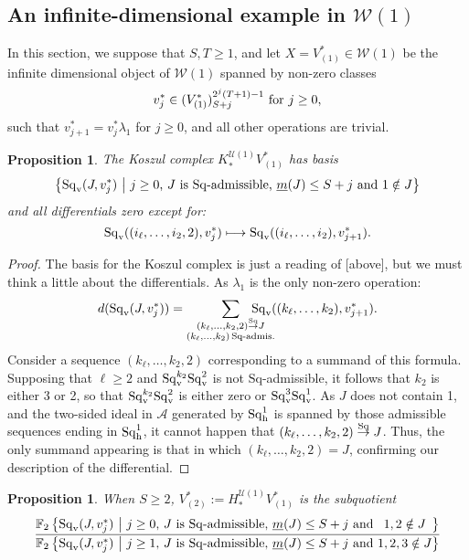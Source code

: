 \documentclass[11pt]{amsart}
\theoremstyle{plain}
\newtheorem{prop}[thm]{Proposition}
\theoremstyle{definition}
\newcommand{\calU}{\mathcal{U}}
\newcommand{\calA}{\mathcal{A}}
\newcommand{\calw}{\mathcal{W}}
\theoremstyle{plain}
\newcommand{\minDimSq}{\underline{m}}
\newcommand{\produces}[3]{#3:#1\sim #2}
\renewcommand{\produces}[3]{#1\rightarrow_{#3} #2}%
\renewcommand{\produces}[3]{#1\overset{\smash{#3}}{\rightarrow} #2}%
\newcommand{\Sq}{\mathrm{Sq}}
\newcommand{\Sqh}{\mathrm{Sq}_\textup{h}}
\newcommand{\Sqv}{\mathrm{Sq}_\textup{v}}
\newcommand{\LieSteen}{\calA}
\newcommand{\F}{\mathbb{F}}
\begin{document}
\begin{Calculations of HWn for n nonzero}
\subsection{An infinite-dimensional example in $\calw(1)$}
In this section, we suppose that $S,T\geq1$, and let $X=V^*_{(1)}\in\calw(1)$ be the infinite dimensional object of $\calw(1)$ spanned by non-zero classes
\[v_{j}^{*}\in (V^*_{(1)})^{2^{j}(T+1)-1}_{S+j}\textup{ for $j\geq 0$},\] such that $v_{j+1}^*=v^*_j\lambda_{1}$ for $j\geq 0$, and all other operations are trivial. %
\begin{prop}\label{calc of koszul complex in inf dim example}
The Koszul complex $K_*^{\calU(1)}V^*_{(1)}$ has basis
\[\left\{\Sq_{\textup{v}}(J,v_j^*)\ \middle|\ \textup{$j\geq0$, $J$ is $\Sq$-admissible, $\minDimSq(J)\leq S+j$ and $1\notin J$}\right\} \]
and all differentials zero except for:
\[\Sq_{\textup{v}}((i_\ell,\ldots,i_2,2),v^*_{j})\longmapsto \Sq_{\textup{v}}((i_\ell,\ldots,i_2),v^*_{j+1}).\]
\end{prop}
\begin{proof}
The basis for the Koszul complex is just a reading of [above], but we must think a little about the differentials. As $\lambda_1$ is the only non-zero operation:
\[d(\Sqv(J,v^*_j))=\sum_{ \substack{\produces{(k_{\ell},\ldots,k_2,2)}{J}{\Sq}\\(k_{\ell},\ldots,k_2){\,\Sq\textup{-admis.}}}}\!\!\!\!\!\!\!\!\!\!\!\! \Sqv((k_{\ell},\ldots,k_2),v_{j+1}^*).\]
Consider a sequence $(k_\ell,\ldots,k_2,2)$ corresponding to a summand of this formula. Supposing that $\ell\geq2$ and $\Sqv^{k_2}\Sqv^2$ is not $\Sq$-admissible, it follows that $k_2$ is either 3 or 2, so that $\Sqv^{k_2}\Sqv^2$ is either zero or $\Sqv^{3}\Sqv^1$. As $J$ does not contain 1, and the two-sided ideal in $\LieSteen$ generated by $\Sqh^1$ is spanned by those admissible sequences ending in $\Sqh^1$, it cannot happen that $\produces{(k_{\ell},\ldots,k_2,2)}{J}{\Sq}$. Thus, the only summand appearing is that in which $(k_{\ell},\ldots,k_2,2)=J$, confirming our description of the differential.
\end{proof}
\begin{prop}\label{Sg1 calc of V2}
When $S\geq2$, $V^*_{(2)}:=H_*^{\calU(1)}V^*_{(1)}$ is the subquotient
\[\frac{{\F_{2}\left\{\Sq_{\textup{v}}(J,v_j^*)\ \middle|\ \makebox[\widthof{$\textup{$j\geq0$}$}][c]{$\textup{$j\geq0$}$}\textup{, $J$ is $\Sq$-admissible, $\minDimSq(J)\leq S+j$ and}\makebox[\widthof{$\textup{ $1,2,3\notin J$}$}][c]{$\textup{ $1,2\notin J$}$}\right\}}}{{\F_{2}\left\{\Sq_{\textup{v}}(J,v_j^*)\ \middle|\ \makebox[\widthof{$\textup{$j\geq0$}$}][c]{$\textup{$j\geq1$}$}\textup{, $J$ is $\Sq$-admissible, $\minDimSq(J)\leq S+j$ and}\makebox[\widthof{$\textup{ $1,2,3\notin J$}$}][c]{$\textup{ $1,2,3\notin J$}$}\right\}}}\]

\end{prop}
\end{Calculations of HWn for n nonzero}
\end{document}
